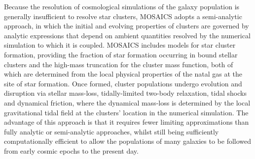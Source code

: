 \documentclass[fleqn,usenatbib]{mnras}
\begin{document}
Because the resolution of cosmological simulations of the galaxy population is generally insufficient to resolve star clusters, MOSAICS adopts a semi-analytic approach, in which the initial and evolving properties of clusters are governed by analytic expressions that depend on ambient quantities resolved by the numerical simulation to which it is coupled. MOSAICS includes models for star cluster formation, providing the fraction of star formation occurring in bound stellar clusters and the high-mass truncation for the cluster mass function, both of which are determined from the local physical properties of the natal gas at the site of star formation. Once formed, cluster populations undergo evolution and disruption via stellar mass-loss, tidally-limited two-body relaxation, tidal shocks and dynamical friction, where the dynamical mass-loss is determined by the local gravitational tidal field at the clusters' location in the numerical simulation. The advantage of this approach is that it requires fewer limiting approximations than fully analytic or semi-analytic approaches, whilst still being sufficiently computationally efficient to allow the populations of many galaxies to be followed from early cosmic epochs to the present day.
\end{document}
